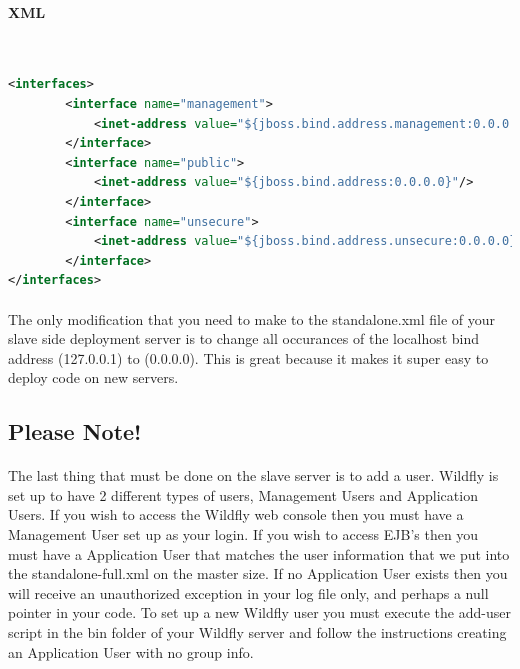 \documentclass[
10pt, %
letterpaper, %
oneside, %
headinclude,footinclude, %
BCOR5mm, %
]{scrartcl}
\begin{document}

\paragraph{XML}~
\begin{lstlisting}[language=XML]
<interfaces>
        <interface name="management">
            <inet-address value="${jboss.bind.address.management:0.0.0.0}"/>
        </interface>
        <interface name="public">
            <inet-address value="${jboss.bind.address:0.0.0.0}"/>
        </interface>
        <interface name="unsecure">
            <inet-address value="${jboss.bind.address.unsecure:0.0.0.0}"/>
        </interface>
</interfaces>
\end{lstlisting}
 
\paragraph{} The only modification that you need to make to the standalone.xml file of your slave side deployment server is to change all occurances of the localhost bind address (127.0.0.1) to (0.0.0.0). This is great because it makes it super easy to deploy code on new servers.


\subsection{Please Note!}


\paragraph{} The last thing that must be done on the slave server is to add a user. Wildfly is set up to have 2 different types of users, Management Users and Application Users. If you wish to access the Wildfly web console then you must have a Management User set up as your login. If you wish to access EJB's then you must have a Application User that matches the user information that we put into the standalone-full.xml on the master size. If no Application User exists then you will receive an unauthorized exception in your log file only, and perhaps a null pointer in your code. To set up a new Wildfly user you must execute the add-user script in the bin folder of your Wildfly server and follow the instructions creating an Application User with no group info.
\end{document}
